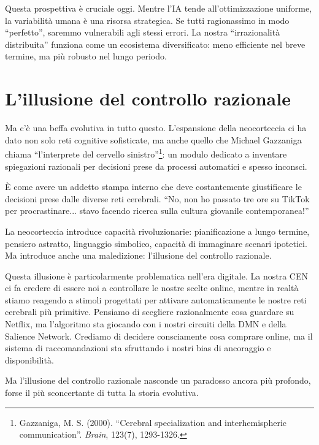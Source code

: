 Questa prospettiva è cruciale oggi. Mentre l'IA tende all'ottimizzazione uniforme, la variabilità umana è una risorsa strategica. Se tutti ragionassimo in modo ``perfetto'', saremmo vulnerabili agli stessi errori. La nostra ``irrazionalità distribuita'' funziona come un ecosistema diversificato: meno efficiente nel breve termine, ma più robusto nel lungo periodo.

\section{L'illusione del controllo razionale}

Ma c'è una beffa evolutiva in tutto questo. L'espansione della neocorteccia ci ha dato non solo reti cognitive sofisticate, ma anche quello che Michael Gazzaniga chiama ``l'interprete del cervello sinistro''\footnote{Gazzaniga, M. S. (2000). ``Cerebral specialization and interhemispheric communication''. \textit{Brain}, 123(7), 1293-1326.}: un modulo dedicato a inventare spiegazioni razionali per decisioni prese da processi automatici e spesso inconsci.

È come avere un addetto stampa interno che deve costantemente giustificare le decisioni prese dalle diverse reti cerebrali. ``No, non ho passato tre ore su TikTok per procrastinare... stavo facendo ricerca sulla cultura giovanile contemporanea!''

La neocorteccia introduce capacità rivoluzionarie: pianificazione a lungo termine, pensiero astratto, linguaggio simbolico, capacità di immaginare scenari ipotetici. Ma introduce anche una maledizione: l'illusione del controllo razionale.

Questa illusione è particolarmente problematica nell'era digitale. La nostra CEN ci fa credere di essere noi a controllare le nostre scelte online, mentre in realtà stiamo reagendo a stimoli progettati per attivare automaticamente le nostre reti cerebrali più primitive. Pensiamo di scegliere razionalmente cosa guardare su Netflix, ma l'algoritmo sta giocando con i nostri circuiti della DMN e della Salience Network. Crediamo di decidere consciamente cosa comprare online, ma il sistema di raccomandazioni sta sfruttando i nostri bias di ancoraggio e disponibilità.

Ma l'illusione del controllo razionale nasconde un paradosso ancora più profondo, forse il più sconcertante di tutta la storia evolutiva.

